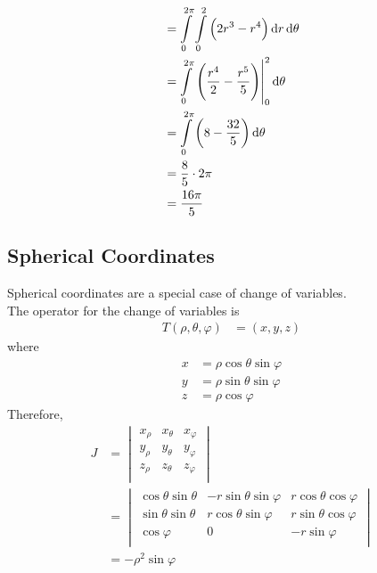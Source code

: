 \documentclass[fleqn, a4paper, 12pt, twoside]{article}
\theoremstyle{definition}
\theoremstyle{theorem}
\begin{document}
{\begin{solution}
\begin{align*}
                  & = \int\limits_{0}^{2 \pi} \int\limits_{0}^{2} \left( 2 r^3 - r^4 \right) \dif r \dif \theta                                                            \\
                  & = \int\limits_{0}^{2 \pi} \left. \left( \frac{r^4}{2} - \frac{r^5}{5} \right) \right|_{0}^{2} \dif \theta                                              \\
                  & = \int\limits_{0}^{2 \pi} \left( 8 - \frac{32}{5} \right) \dif \theta                                                                                  \\
                  & = \frac{8}{5} \cdot 2 \pi                                                                                                                              \\
                  & = \frac{16 \pi}{5}
	\end{align*}
\end{solution}

\subsection{Spherical Coordinates}

Spherical coordinates are a special case of change of variables.\\
The operator for the change of variables is
\begin{align*}
	T(\rho,\theta,\varphi) & = (x,y,z)
\end{align*}
where
\begin{align*}
	x & = \rho \cos \theta \sin \varphi \\
	y & = \rho \sin \theta \sin \varphi \\
	z & = \rho \cos \varphi
\end{align*}
Therefore,
\begin{align*}
	J &=
		\begin{vmatrix}
			x_{\rho} & x_{\theta} & x_{\varphi} \\
			y_{\rho} & y_{\theta} & y_{\varphi} \\
			z_{\rho} & z_{\theta} & z_{\varphi} \\
		\end{vmatrix}\\
	  &=
		\begin{vmatrix}
			\cos \theta \sin \theta & -r \sin \theta \sin \varphi & r \cos \theta \cos \varphi \\
			\sin \theta \sin \theta & r \cos \theta \sin \varphi  & r \sin \theta \cos \varphi \\
			\cos \varphi            & 0                           & -r \sin \varphi            \\
		\end{vmatrix}\\
	  &= -\rho^2 \sin \varphi
\end{align*}

}
\end{document}
